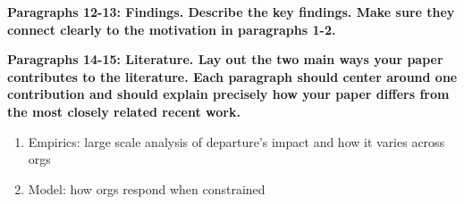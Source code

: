 \documentclass[source/paper/main.tex]{subfiles}
\begin{document}
\textbf{Paragraphs 12-13: Findings. Describe the key findings. Make sure they connect clearly to the motivation in paragraphs 1-2.}


\textbf{Paragraphs 14-15: Literature. Lay out the two main ways your paper contributes to the literature. Each paragraph should center around one contribution and should explain precisely how your paper differs from the most closely related recent work.}
\begin{enumerate}
    \item Empirics: large scale analysis of departure's impact and how it varies across orgs
    \item Model: how orgs respond when constrained
\end{enumerate}
\end{document}

